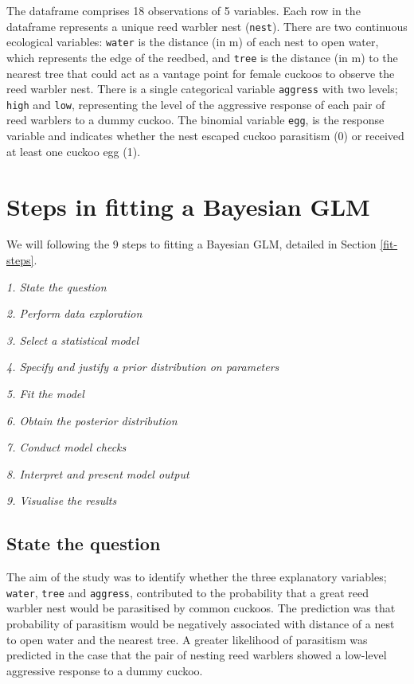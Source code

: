 \documentclass[
]{book}
\begin{document}
The dataframe comprises 18 observations of 5 variables. Each row in the dataframe represents a unique reed warbler nest (\texttt{nest}). There are two continuous ecological variables: \texttt{water} is the distance (in m) of each nest to open water, which represents the edge of the reedbed, and \texttt{tree} is the distance (in m) to the nearest tree that could act as a vantage point for female cuckoos to observe the reed warbler nest. There is a single categorical variable \texttt{aggress} with two levels; \texttt{high} and \texttt{low}, representing the level of the aggressive response of each pair of reed warblers to a dummy cuckoo. The binomial variable \texttt{egg}, is the response variable and indicates whether the nest escaped cuckoo parasitism (0) or received at least one cuckoo egg (1).

\hypertarget{bern-glm-steps}{%
\section{Steps in fitting a Bayesian GLM}\label{bern-glm-steps}}

We will following the 9 steps to fitting a Bayesian GLM, detailed in Section \ref{fit-steps}.

\emph{1. State the question}

\emph{2. Perform data exploration}

\emph{3. Select a statistical model}

\emph{4. Specify and justify a prior distribution on parameters}

\emph{5. Fit the model}

\emph{6. Obtain the posterior distribution}

\emph{7. Conduct model checks}

\emph{8. Interpret and present model output}

\emph{9. Visualise the results}

\hypertarget{cc-question}{%
\subsection{State the question}\label{cc-question}}

The aim of the study was to identify whether the three explanatory variables; \texttt{water}, \texttt{tree} and \texttt{aggress}, contributed to the probability that a great reed warbler nest would be parasitised by common cuckoos. The prediction was that probability of parasitism would be negatively associated with distance of a nest to open water and the nearest tree. A greater likelihood of parasitism was predicted in the case that the pair of nesting reed warblers showed a low-level aggressive response to a dummy cuckoo.
\end{document}
